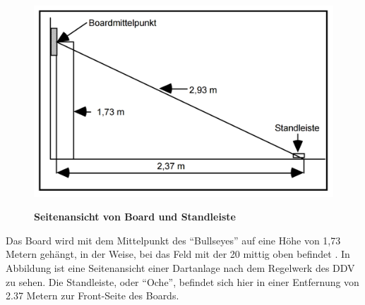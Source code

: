 \begin{figure}
\includegraphics[width=\textwidth]{media/Dartsfield}\\
\caption{\textbf{Seitenansicht von Board und Standleiste 
\cite[8]{DartsRegel2016}}
}
\label{Fig:dartsetup}
\end{figure}


Das Board wird mit dem Mittelpunkt des "`Bullseyes"' auf eine Höhe von 1,73 Metern gehängt, in der Weise, bei das Feld mit der 20 mittig oben befindet \autocite[6-8]{DartsRegel2016}. In Abbildung  ist eine Seitenansicht einer Dartanlage nach dem Regelwerk des DDV zu sehen. Die Standleiste, oder "`Oche"', befindet sich hier in einer Entfernung von 2.37 Metern zur Front-Seite des Boards.

